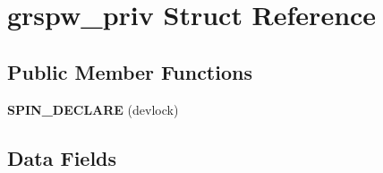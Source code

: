 \hypertarget{structgrspw__priv}{}\section{grspw\+\_\+priv Struct Reference}
\label{structgrspw__priv}
\subsection*{Public Member Functions}
\begin{DoxyCompactItemize}
\item 
\mbox{\label{structgrspw__priv_a4c278058a83b20f66b7a19ca88d00f58}} 
{\bfseries S\+P\+I\+N\+\_\+\+D\+E\+C\+L\+A\+RE} (devlock)
\end{DoxyCompactItemize}
\subsection*{Data Fields}
